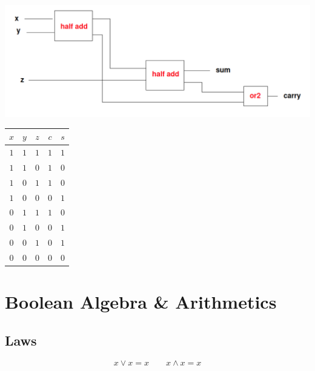 \documentclass[english,course]{Notes}
\begin{document}
\begin{enumerate}
\begin{minipage}{\linewidth}
\begin{minipage}{0.65\linewidth}
              \includegraphics[width=\linewidth]{fullAdder.png}

      \end{minipage}
      \hspace{0.05\linewidth}
      \begin{minipage}{0.25\linewidth}
      \begin{tabular}{|c|c|c|c|c|}
		$x$ & $y$ & $z$ & $c$ & $s$  \\
		\hline
		$1$ & $1$ & $1$ &  $1$ & $1$ \\
		$1$ & $1$ & $0$ &  $1$ & $0$ \\
		$1$ & $0$ & $1$ &  $1$ & $0$ \\
		$1$ & $0$ & $0$ &  $0$ & $1$ \\ 
		$0$ & $1$ & $1$ &  $1$ & $0$ \\ 
		$0$ & $1$ & $0$ &  $0$ & $1$ \\
		$0$ & $0$ & $1$ &  $0$ & $1$ \\ 
		$0$ & $0$ & $0$ &  $0$ & $0$ \\
	\end{tabular}
	\end{minipage}
	
\end{minipage}
\end{enumerate}

\section{Boolean Algebra \& Arithmetics}
\subsection{Laws}


$$ x \lor x = x \quad \quad x \land x = x$$

\end{document}
